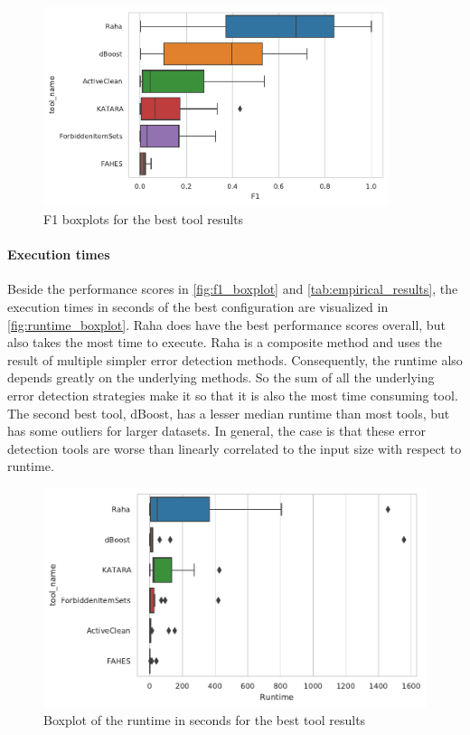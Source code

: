 \begin{figure}
\centering
\includegraphics[width=0.9\textwidth]{Figures/RQ1/F1Boxplot.pdf}
\caption{F1 boxplots for the best tool results}
\label{fig:f1_boxplot}
\end{figure}

\paragraph{Execution times} 
Beside the performance scores in \autoref{fig:f1_boxplot} and \autoref{tab:empirical_results}, the execution times in seconds of the best configuration are visualized in \autoref{fig:runtime_boxplot}. Raha does have the best performance scores overall, but also takes the most time to execute. Raha is a composite method and uses the result of multiple simpler error detection methods. Consequently, the runtime also depends greatly on the underlying methods. So the sum of all the underlying error detection strategies make it so that it is also the most time consuming tool. The second best tool, dBoost, has a lesser median runtime than most tools, but has some outliers for larger datasets. In general, the case is that these error detection tools are worse than linearly correlated to the input size with respect to runtime. 

\begin{figure}
    \centering
    \begin{adjustbox}{center}
    \includegraphics[width=\linewidth]{thesis/Figures/RQ1/RuntimeBoxplot.pdf}
    \end{adjustbox}
    \caption{Boxplot of the runtime in seconds for the best tool results}
    \label{fig:runtime_boxplot}
\end{figure}


